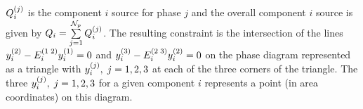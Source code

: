 $\mfr[Q]{i}{j}$ is the component $i$ source for phase $j$ and the overall component $i$ source is given by $Q_i=\summation_{j=1}^{{\cal N}_p} \mfr[Q]{i}{j}$.  The resulting constraint is the intersection of the lines $\mfr[y]{i}{2} - \mfr[E]{i}{1\;2} \mfr[y]{i}{1}=0$ and $\mfr[y]{i}{3} - \mfr[E]{i}{2\;3}\mfr[y]{i}{2}= 0$ on the phase diagram represented as a triangle with $\mfr[y]{i}{j}, \; j =1,2,3$ at each of the three corners of the triangle. The three $\mfr[y]{i}{j}, \; j =1,2,3$ for a given component $i$ represents a point (in area coordinates) on this diagram.
